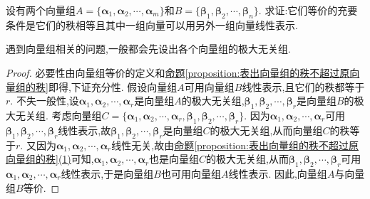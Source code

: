 \documentclass[../../main.tex]{subfiles}
\begin{document}
\begin{proposition}[向量组等价的充要条件]\label{proposition:向量组等价的充要条件}
设有两个向量组\(A = \{\boldsymbol{\alpha}_1,\boldsymbol{\alpha}_2,\cdots,\boldsymbol{\alpha}_m\}\)和\(B = \{\boldsymbol{\beta}_1,\boldsymbol{\beta}_2,\cdots,\boldsymbol{\beta}_n\}\). 求证:它们等价的充要条件是它们的秩相等且其中一组向量可以用另外一组向量线性表示.
\end{proposition}
\begin{note}
遇到向量组相关的问题,一般都会先设出各个向量组的极大无关组.
\end{note}
\begin{proof}
必要性由向量组等价的定义和\hyperref[proposition:表出向量组的秩不超过原向量组的秩]{命题\ref{proposition:表出向量组的秩不超过原向量组的秩}}即得,下证充分性. 假设向量组\(A\)可用向量组\(B\)线性表示,且它们的秩都等于\(r\). 不失一般性,设\(\boldsymbol{\alpha}_1,\boldsymbol{\alpha}_2,\cdots,\boldsymbol{\alpha}_r\)是向量组\(A\)的极大无关组,\(\boldsymbol{\beta}_1,\boldsymbol{\beta}_2,\cdots,\boldsymbol{\beta}_r\)是向量组\(B\)的极大无关组. 考虑向量组\(C = \{\boldsymbol{\alpha}_1,\boldsymbol{\alpha}_2,\cdots,\boldsymbol{\alpha}_r,\boldsymbol{\beta}_1,\boldsymbol{\beta}_2,\cdots,\boldsymbol{\beta}_r\}\). 因为\(\boldsymbol{\alpha}_1,\boldsymbol{\alpha}_2,\cdots,\boldsymbol{\alpha}_r\)可用\(\boldsymbol{\beta}_1,\boldsymbol{\beta}_2,\cdots,\boldsymbol{\beta}_r\)线性表示,故\(\boldsymbol{\beta}_1,\boldsymbol{\beta}_2,\cdots,\boldsymbol{\beta}_r\)是向量组\(C\)的极大无关组,从而向量组\(C\)的秩等于\(r\). 又因为\(\boldsymbol{\alpha}_1,\boldsymbol{\alpha}_2,\cdots,\boldsymbol{\alpha}_r\)线性无关,故由\hyperref[proposition:表出向量组的秩不超过原向量组的秩]{命题\ref{proposition:表出向量组的秩不超过原向量组的秩}(1)}可知,\(\boldsymbol{\alpha}_1,\boldsymbol{\alpha}_2,\cdots,\boldsymbol{\alpha}_r\)也是向量组\(C\)的极大无关组,从而\(\boldsymbol{\beta}_1,\boldsymbol{\beta}_2,\cdots,\boldsymbol{\beta}_r\)可用\(\boldsymbol{\alpha}_1,\boldsymbol{\alpha}_2,\cdots,\boldsymbol{\alpha}_r\)线性表示,于是向量组\(B\)也可用向量组\(A\)线性表示. 因此,向量组\(A\)与向量组\(B\)等价. 
\end{proof}
\end{document}
